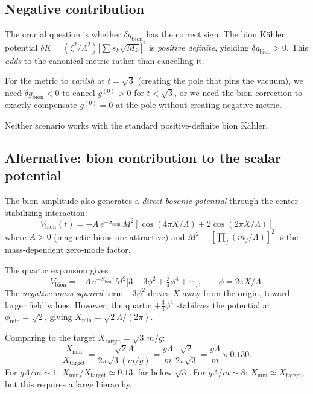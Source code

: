 \subsection{Negative contribution}

The crucial question is whether $\delta g_{\text{bion}}$ has the correct sign.
The bion K\"ahler potential $\delta K = (\zeta^2/\Lambda^2)|\sum s_k \sqrt{M_k}|^2$
is \emph{positive definite}, yielding $\delta g_{\text{bion}} > 0$.
This \emph{adds} to the canonical metric rather than cancelling it.

For the metric to \emph{vanish} at $t = \sqrt{3}$
(creating the pole that pins the vacuum), we need $\delta g_{\text{bion}} < 0$
to cancel $g^{(0)} > 0$ for $t < \sqrt{3}$, or we need the bion correction to
exactly compensate $g^{(0)} = 0$ at the pole without creating negative metric.

Neither scenario works with the standard positive-definite bion K\"ahler.

\subsection{Alternative: bion contribution to the scalar potential}

The bion amplitude also generates a \emph{direct bosonic potential}
through the center-stabilizing interaction:
\begin{equation}
V_{\text{bion}}(t) = -A\,e^{-S_{\text{bion}}}\,M^2\!\left[\cos(4\pi X/\Lambda)
+ 2\cos(2\pi X/\Lambda)\right]
\end{equation}
where $A > 0$ (magnetic bions are attractive) and $M^2 = [\prod_f (m_f/\Lambda)]^2$
is the mass-dependent zero-mode factor.

The quartic expansion gives
\begin{equation}
V_{\text{bion}} = -A\,e^{-S_{\text{bion}}}\,M^2\bigl[3 - 3\phi^2 + \tfrac{3}{4}\phi^4 + \cdots\bigr],
\qquad \phi = 2\pi X/\Lambda.
\end{equation}
The \emph{negative mass-squared} term $-3\phi^2$ drives $X$ away from the origin,
toward larger field values. However, the quartic $+\frac{3}{4}\phi^4$ stabilizes the
potential at $\phi_{\min} = \sqrt{2}$, giving $X_{\min} = \sqrt{2}\Lambda/(2\pi)$.

Comparing to the target $X_{\text{target}} = \sqrt{3}\,m/g$:
\begin{equation}
\frac{X_{\min}}{X_{\text{target}}} = \frac{\sqrt{2}\Lambda}{2\pi\sqrt{3}(m/g)}
= \frac{g\Lambda}{m}\,\frac{\sqrt{2}}{2\pi\sqrt{3}}
= \frac{g\Lambda}{m}\times 0.130.
\end{equation}
For $g\Lambda/m \sim 1$: $X_{\min}/X_{\text{target}} \simeq 0.13$, far below $\sqrt{3}$.
For $g\Lambda/m \sim 8$: $X_{\min} \simeq X_{\text{target}}$, but this requires a large hierarchy.

